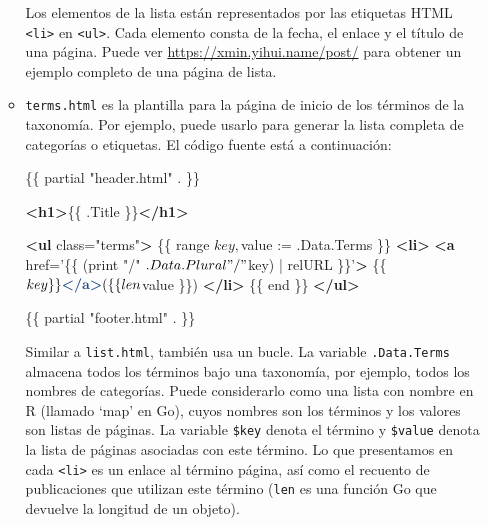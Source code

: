\documentclass[12pt,]{krantz}
\makeatletter
\newenvironment{Shaded}{\begin{snugshade}}{\end{snugshade}}
\newcommand{\KeywordTok}[1]{\textcolor[rgb]{0.13,0.29,0.53}{\textbf{#1}}}
\newcommand{\NormalTok}[1]{#1}
\newcommand{\OtherTok}[1]{\textcolor[rgb]{0.56,0.35,0.01}{#1}}
\newcommand{\StringTok}[1]{\textcolor[rgb]{0.31,0.60,0.02}{#1}}
\newenvironment{kframe}{%
\medskip{}
\setlength{\fboxsep}{.8em}
 \def\at@end@of@kframe{}%
 \ifinner\ifhmode%
  \def\at@end@of@kframe{\end{minipage}}%
  \begin{minipage}{\columnwidth}%
 \fi\fi%
 \def\FrameCommand##1{\hskip\@totalleftmargin \hskip-\fboxsep
 \colorbox{shadecolor}{##1}\hskip-\fboxsep
     \hskip-\linewidth \hskip-\@totalleftmargin \hskip\columnwidth}%
 \MakeFramed {\advance\hsize-\width
   \@totalleftmargin\z@ \linewidth\hsize
   \@setminipage}}%
 {\par\unskip\endMakeFramed%
 \at@end@of@kframe}
\renewenvironment{Shaded}{\begin{kframe}}{\end{kframe}}
\theoremstyle{definition}
\theoremstyle{definition}
\theoremstyle{definition}
\theoremstyle{remark}
\makeatother
\begin{document}
\begin{itemize}
\begin{itemize}
    Los elementos de la lista están representados por las etiquetas HTML
    \texttt{\textless{}li\textgreater{}} en
    \texttt{\textless{}ul\textgreater{}}. Cada elemento consta de la
    fecha, el enlace y el título de una página. Puede ver
    \url{https://xmin.yihui.name/post/} para obtener un ejemplo completo
    de una página de lista.
  \item
    \texttt{terms.html} es la plantilla para la página
    de inicio de los términos de la taxonomía. Por ejemplo, puede usarlo
    para generar la lista completa de categorías o etiquetas. El código
    fuente está a continuación:

\begin{Shaded}
\begin{Highlighting}[]
\NormalTok{\{\{ partial "header.html" . \}\}}

\KeywordTok{<h1>}\NormalTok{\{\{ .Title \}\}}\KeywordTok{</h1>}

\KeywordTok{<ul}\OtherTok{ class=}\StringTok{"terms"}\KeywordTok{>}
\NormalTok{  \{\{ range $key, $value := .Data.Terms \}\}}
  \KeywordTok{<li>}
    \KeywordTok{<a}\OtherTok{ href=}\StringTok{'\{\{ (print "/" $.Data.Plural "/" $key) | relURL \}\}'}\KeywordTok{>}
\NormalTok{      \{\{ $key \}\}}
    \KeywordTok{</a>}
\NormalTok{    (\{\{ len $value \}\})}
  \KeywordTok{</li>}
\NormalTok{  \{\{ end \}\}}
\KeywordTok{</ul>}

\NormalTok{\{\{ partial "footer.html" . \}\}}
\end{Highlighting}
\end{Shaded}

    Similar a \texttt{list.html}, también usa un bucle. La variable
    \texttt{.Data.Terms} almacena todos los términos bajo una taxonomía,
    por ejemplo, todos los nombres de categorías. Puede considerarlo
    como una lista con nombre en R (llamado `map' en Go), cuyos nombres
    son los términos y los valores son listas de páginas. La variable
    \texttt{\$key} denota el término y \texttt{\$value} denota la lista
    de páginas asociadas con este término. Lo que presentamos en cada
    \texttt{\textless{}li\textgreater{}} es un enlace al término página,
    así como el recuento de publicaciones que utilizan este término
    (\texttt{len} es una función Go que devuelve la longitud de un
    objeto).


\end{itemize}
\end{itemize}
\end{document}
